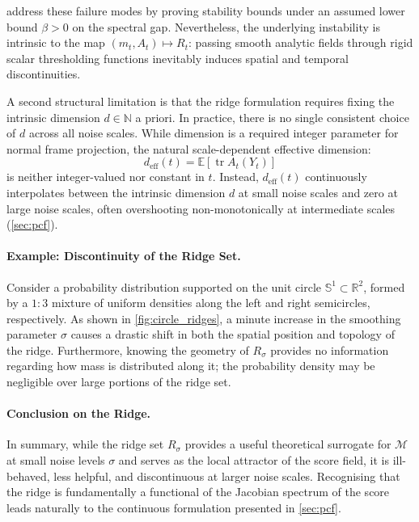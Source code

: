 \documentclass{article}
\DeclareMathOperator{\tr}{tr}
\newcommand{\E}{\mathbb{E}}
\newcommand{\R}{\mathbb{R}}
\newcommand{\M}{\mathcal{M}}
\newcommand{\deff}{d_{\mathrm{eff}}}
\theoremstyle{plain}
\theoremstyle{definition}
\theoremstyle{remark}
\begin{document}
\citet{genovese2014nonparametric} address these failure modes by proving stability bounds under an assumed lower bound $\beta > 0$ on the spectral gap. Nevertheless, the underlying instability is intrinsic to the map $(m_t, A_t) \mapsto R_t$: passing smooth analytic fields through rigid scalar thresholding functions inevitably induces spatial and temporal discontinuities.

A second structural limitation is that the ridge formulation requires fixing the intrinsic dimension $d \in \mathbb{N}$ a priori. In practice, there is no single consistent choice of $d$ across all noise scales. While dimension is a required integer parameter for normal frame projection, the natural scale-dependent effective dimension:
\begin{equation}
    \deff(t) = \E\left[\tr A_t(Y_t)\right]
\end{equation}
is neither integer-valued nor constant in $t$. Instead, $\deff(t)$ continuously interpolates between the intrinsic dimension $d$ at small noise scales and zero at large noise scales, often overshooting non-monotonically at intermediate scales (\autoref{sec:pcf}).

\paragraph{Example: Discontinuity of the Ridge Set.} 
Consider a probability distribution supported on the unit circle $\mathbb{S}^1 \subset \R^2$, formed by a $1:3$ mixture of uniform densities along the left and right semicircles, respectively. As shown in \autoref{fig:circle_ridges}, a minute increase in the smoothing parameter $\sigma$ causes a drastic shift in both the spatial position and topology of the ridge. Furthermore, knowing the geometry of $R_\sigma$ provides no information regarding how mass is distributed along it; the probability density may be negligible over large portions of the ridge set.



\paragraph{Conclusion on the Ridge.} In summary, while the ridge set $R_\sigma$ provides a useful theoretical surrogate for $\M$ at small noise levels $\sigma$ and serves as the local attractor of the score field, it is ill-behaved, less helpful, and discontinuous at larger noise scales. Recognising that the ridge is fundamentally a functional of the Jacobian spectrum of the score leads naturally to the continuous formulation presented in \autoref{sec:pcf}.
\end{document}
